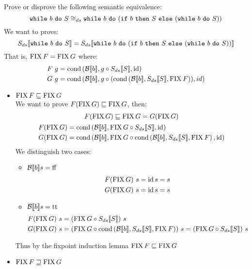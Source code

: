\begin{exercise}{
    Prove or disprove the following semantic equivalence:
    \[ \wwhile{b}{S} \cong_{ds} \wwhile{b}{(\wif{b}{S}{(\wwhile{b}{S})})} \]
}
    We want to prove:
    \[ \Sds{\wwhile{b}{S}} = \Sds{\wwhile{b}{(\wif{b}{S}{(\wwhile{b}{S})})}} \]
    That is, $\FIX F = \FIX G$ where:
    \begin{align*}
        F\ g &= \cond{\Bool{b}}{g \circ \Sds{S}}{\id} \\
        G\ g &= \cond{\Bool{b}}{g \circ (\cond{\Bool{b}}{\Sds{S}}{\FIX F})}{id}
    \end{align*}
    \begin{itemize}
        \item $\FIX F \sqsubseteq \FIX G$ \\
            We want to prove $F (\FIX G) \sqsubseteq \FIX G$, then:
            \begin{gather*}
                F (\FIX G) \sqsubseteq \FIX G = G(\FIX G) \\
                \begin{aligned}
                    F (\FIX G) &= \cond{\Bool{b}}{\FIX G \circ \Sds{S}}{\id} \\
                    G (\FIX G) &= \cond{\Bool{b}}{\FIX G \circ \cond{\Bool{b}}{\Sds{S}}{\FIX F}}{\id}
                \end{aligned}
            \end{gather*}
            We distinguish two cases:
            \begin{itemize}
                \item $\Bool{b} s = \text{ff}$
                    \begin{align*}
                        F (\FIX G)\ s = \id s = s \\
                        G (\FIX G)\ s = \id s = s
                    \end{align*}
                \item $\Bool{b} s = \text{tt}$
                    \begin{align*}
                        F (\FIX G)\ s &= (\FIX G \circ \Sds{S})\ s \\
                        G (\FIX G)\ s &= (\FIX G \circ \cond{\Bool{b}}{\Sds{S}}{\FIX F})\ s = (\FIX G \circ \Sds{S})\ s
                    \end{align*}
            \end{itemize}
            Thus by the fixpoint induction lemma $\FIX F \sqsubseteq \FIX G$
        \item $\FIX F \sqsupseteq \FIX G$ \\

\end{itemize}
\end{exercise}
